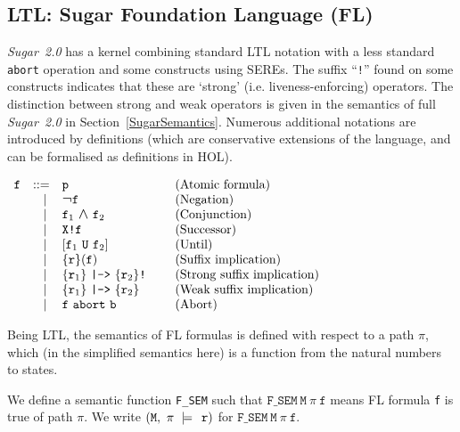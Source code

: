 \documentclass{llncs}
\renewcommand{\c}{{\hspace*{2.5mm}}}
\newcommand{\fSem}[4]{(\tt{#1,~#2~\models^{\hspace*{-2.3mm}\raisebox{1mm}{\tt#3}}~#4})}
\newcommand{\Fsem}{\texttt{F\_SEM}\xspace}
\newcommand\Sugar{{\it{Sugar~2.0}}\xspace}
\newcommand\Hol{HOL\xspace}
\renewcommand{\t}[1]{\texttt{#1}}
\newcommand{\TLNot}{\mbox{\large\bf$\neg$}}
\newcommand{\TLAnd}{\mbox{\large\bf$\wedge$}}
\begin{document}
\vspace*{-6mm}

\subsection{LTL: Sugar Foundation Language (FL)}



\Sugar has a kernel combining standard LTL notation
with a less standard \t{abort} operation and some constructs using SEREs. The suffix
``\texttt{!}'' found on some constructs indicates
that these are `strong' (i.e. liveness-enforcing) operators.  The
distinction between strong and weak operators is given in the
semantics of full \Sugar in Section~\ref{SugarSemantics}. Numerous
additional notations are introduced by definitions (which are
conservative extensions of the language, and can be formalised as
definitions in \Hol).

\smallskip

$\begin{array}{llll}
{\t{f}} & {\rm ::=} & \t{p}
  & \mbox{\rm(Atomic formula)}\\
 & \phantom{\rm ::}\mid & \TLNot{\t{f}}
  & \mbox{\rm(Negation)}\\
 & \phantom{\rm ::}\mid & {\t{f}}_1~\TLAnd~{\t{f}}_2
  & \mbox{\rm(Conjunction)}\\
 & \phantom{\rm ::}\mid & \texttt{X!}{\t{f}}
  & \mbox{\rm(Successor)}\\
 & \phantom{\rm ::}\mid & [{\t{f}}_1~\texttt{U}~{\t{f}}_2]~~~~
  & \mbox{\rm(Until)}\\
 & \phantom{\rm ::}\mid & \{{\t{r}}\}({\t{f}})~~~~
  & \mbox{\rm(Suffix implication)}\\
 & \phantom{\rm ::}\mid & \{{\t{r}}_1\}~\texttt{|->}~\{{\t{r}}_2\}\texttt{!}~~~~
  & \mbox{\rm(Strong suffix implication)}\\
 & \phantom{\rm ::}\mid & \{{\t{r}}_1\}~\texttt{|->}~\{{\t{r}}_2\}~~~~
  & \mbox{\rm(Weak suffix implication)}\\
 & \phantom{\rm ::}\mid & \t{f}~\texttt{abort}~{\t{b}}~~~~
  & \mbox{\rm(Abort)}\\
\end{array}$

\medskip

Being LTL, the semantics of FL formulas is defined with respect to a path $\pi$,
which (in the simplified semantics here) is a function from the natural numbers to states.

We define a semantic function \Fsem such that $\Fsem~\t{M}~\pi~\t{f}$
means FL formula \t{f} is true of path $\pi$.
We write $\fSem{M}{\pi}{\c}{r}$ for $\Fsem~\t{M}~\pi~\t{f}$.
\end{document}
